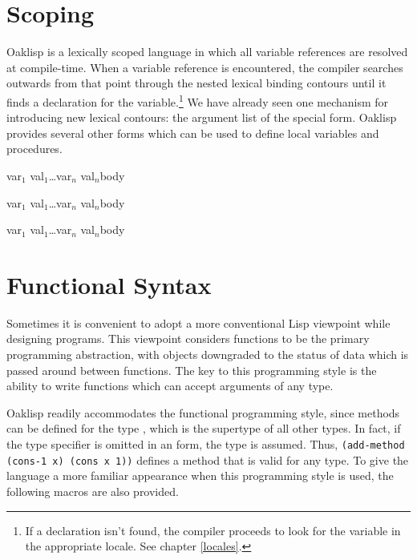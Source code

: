 \section{Scoping}

Oaklisp is a lexically scoped language in which all variable
references are resolved at compile-time.  When a variable reference is
encountered, the compiler searches outwards from that point through
the nested lexical binding contours until it finds a declaration for
the variable.\footnote{If a declaration isn't found, the compiler
proceeds to look for the variable in the appropriate locale. See
chapter \ref{locales}.} We have already seen one mechanism for
introducing new lexical contours: the argument list of the
 special form.  Oaklisp provides several other forms
which can be used to define local variables and procedures.

{\lpar\lpar var$_1$ val$_1$\rpar\ldots var$_n$ val$_n$\rpar \dt body}

{\lpar\lpar var$_1$ val$_1$\rpar\ldots var$_n$ val$_n$\rpar \dt body}

{\lpar\lpar var$_1$ val$_1$\rpar\ldots\lpar var$_n$ val$_n$\rpar\rpar \dt body}


\section{Functional Syntax}

Sometimes it is convenient to adopt a more conventional Lisp
viewpoint while designing programs.  This viewpoint considers functions
to be the primary programming abstraction, with objects downgraded to
the status of data which is passed around between functions. The key
to this programming style is the ability to write functions which can accept
arguments of any type.

Oaklisp readily accommodates the functional programming style, since
methods can be defined for the type , which is the
supertype of all other types.  In fact, if the type specifier is
omitted in an  form, the type  is assumed.
Thus, \texttt{(add-method (\mbox{cons-1} x) (cons x 1))} defines a method that
is valid for any type.  To give the language a more familiar
appearance when this programming style is used, the following macros
are also provided.


